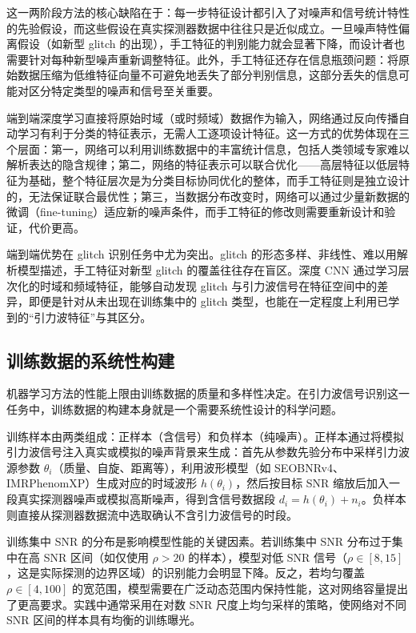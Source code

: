 这一两阶段方法的核心缺陷在于：每一步特征设计都引入了对噪声和信号统计特性的先验假设，而这些假设在真实探测器数据中往往只是近似成立。一旦噪声特性偏离假设（如新型 glitch 的出现），手工特征的判别能力就会显著下降，而设计者也需要针对每种新型噪声重新调整特征。此外，手工特征还存在信息瓶颈问题：将原始数据压缩为低维特征向量不可避免地丢失了部分判别信息，这部分丢失的信息可能对区分特定类型的噪声和信号至关重要。

端到端深度学习直接将原始时域（或时频域）数据作为输入，网络通过反向传播自动学习有利于分类的特征表示，无需人工逐项设计特征。这一方式的优势体现在三个层面：第一，网络可以利用训练数据中的丰富统计信息，包括人类领域专家难以解析表达的隐含规律；第二，网络的特征表示可以联合优化——高层特征以低层特征为基础，整个特征层次是为分类目标协同优化的整体，而手工特征则是独立设计的，无法保证联合最优性；第三，当数据分布改变时，网络可以通过少量新数据的微调（fine-tuning）适应新的噪声条件，而手工特征的修改则需要重新设计和验证，代价更高。

端到端优势在 glitch 识别任务中尤为突出。glitch 的形态多样、非线性、难以用解析模型描述，手工特征对新型 glitch 的覆盖往往存在盲区。深度 CNN 通过学习层次化的时域和频域特征，能够自动发现 glitch 与引力波信号在特征空间中的差异，即便是针对从未出现在训练集中的 glitch 类型，也能在一定程度上利用已学到的“引力波特征”与其区分。

\subsection{训练数据的系统性构建}

机器学习方法的性能上限由训练数据的质量和多样性决定。在引力波信号识别这一任务中，训练数据的构建本身就是一个需要系统性设计的科学问题。

训练样本由两类组成：正样本（含信号）和负样本（纯噪声）。正样本通过将模拟引力波信号注入真实或模拟的噪声背景来生成：首先从参数先验分布中采样引力波源参数 $\theta_i$（质量、自旋、距离等），利用波形模型（如 SEOBNRv4、IMRPhenomXP）生成对应的时域波形 $h(\theta_i)$，然后按目标 SNR 缩放后加入一段真实探测器噪声或模拟高斯噪声，得到含信号数据段 $d_i = h(\theta_i) + n_i$。负样本则直接从探测器数据流中选取确认不含引力波信号的时段。

训练集中 SNR 的分布是影响模型性能的关键因素。若训练集中 SNR 分布过于集中在高 SNR 区间（如仅使用 $\rho > 20$ 的样本），模型对低 SNR 信号（$\rho \in [8, 15]$，这是实际探测的边界区域）的识别能力会明显下降。反之，若均匀覆盖 $\rho \in [4, 100]$ 的宽范围，模型需要在广泛动态范围内保持性能，这对网络容量提出了更高要求。实践中通常采用在对数 SNR 尺度上均匀采样的策略，使网络对不同 SNR 区间的样本具有均衡的训练曝光。

